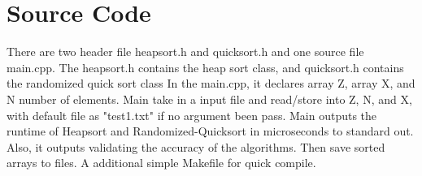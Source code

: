 \documentclass[11pt]{article}
\begin{document}
\section{Source Code}
There are two header file heap\textunderscore sort.h and quick\textunderscore sort.h and one source file main.cpp.
The heap\textunderscore sort.h contains the heap sort class, and quick\textunderscore sort.h contains the randomized quick sort class
In the main.cpp, it declares array Z, array X, and N number of elements.
Main take in a input file and read/store into Z, N, and X, with default file as "test1.txt" if no argument been pass.
Main outputs the runtime of Heapsort and Randomized-Quicksort in microseconds to standard out.
Also, it outputs validating the accuracy of the algorithms.
Then save sorted arrays to files.
A additional simple Makefile for quick compile.
\end{document}

